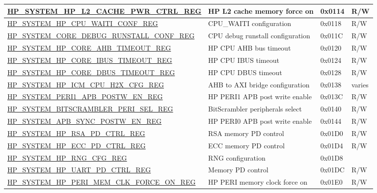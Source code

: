 \begin{longtable}{ | L{8.5cm} | L{6cm} | l | L{1.2cm} | }
\hyperref[regdesc:HPSYSTEMHPL2CACHEPWRCTRLREG]{HP\_SYSTEM\_HP\_L2\_CACHE\_PWR\_CTRL\_REG} & HP L2 cache memory force on & 0x0114 & R/W \\ \hline
\hyperref[regdesc:HPSYSTEMHPCPUWAITICONFREG]{HP\_SYSTEM\_HP\_CPU\_WAITI\_CONF\_REG} & CPU\_WAITI configuration & 0x0118 & R/W \\ \hline
\hyperref[regdesc:HPSYSTEMCOREDEBUGRUNSTALLCONFREG]{HP\_SYSTEM\_CORE\_DEBUG\_RUNSTALL\_CONF\_REG} & CPU debug runstall configuration & 0x011C & R/W \\ \hline
\hyperref[regdesc:HPSYSTEMHPCOREAHBTIMEOUTREG]{HP\_SYSTEM\_HP\_CORE\_AHB\_TIMEOUT\_REG} & HP CPU AHB bus timeout & 0x0120 & R/W \\ \hline
\hyperref[regdesc:HPSYSTEMHPCOREIBUSTIMEOUTREG]{HP\_SYSTEM\_HP\_CORE\_IBUS\_TIMEOUT\_REG} & HP CPU IBUS timeout & 0x0124 & R/W \\ \hline
\hyperref[regdesc:HPSYSTEMHPCOREDBUSTIMEOUTREG]{HP\_SYSTEM\_HP\_CORE\_DBUS\_TIMEOUT\_REG} & HP CPU DBUS timeout & 0x0128 & R/W \\ \hline
\hyperref[regdesc:HPSYSTEMHPICMCPUH2XCFGREG]{HP\_SYSTEM\_HP\_ICM\_CPU\_H2X\_CFG\_REG} & AHB to AXI bridge configuration & 0x0138 & varies \\ \hline
\hyperref[regdesc:HPSYSTEMPERI1APBPOSTWENREG]{HP\_SYSTEM\_PERI1\_APB\_POSTW\_EN\_REG} & HP PERI1 APB post write enable & 0x013C & R/W \\ \hline
\hyperref[regdesc:HPSYSTEMBITSCRAMBLERPERISELREG]{HP\_SYSTEM\_BITSCRAMBLER\_PERI\_SEL\_REG} & BitScrambler peripherals select & 0x0140 & R/W \\ \hline
\hyperref[regdesc:HPSYSTEMAPBSYNCPOSTWENREG]{HP\_SYSTEM\_APB\_SYNC\_POSTW\_EN\_REG} & HP PERI0 APB post write enable & 0x0144 & R/W \\ \hline
\hyperref[regdesc:HPSYSTEMHPRSAPDCTRLREG]{HP\_SYSTEM\_HP\_RSA\_PD\_CTRL\_REG} & RSA memory PD control & 0x01D0 & R/W \\ \hline
\hyperref[regdesc:HPSYSTEMHPECCPDCTRLREG]{HP\_SYSTEM\_HP\_ECC\_PD\_CTRL\_REG} & ECC memory PD control & 0x01D4 & R/W \\ \hline
\hyperref[regdesc:HPSYSTEMHPRNGCFGREG]{HP\_SYSTEM\_HP\_RNG\_CFG\_REG} & RNG configuration & 0x01D8 &  \\ \hline
\hyperref[regdesc:HPSYSTEMHPUARTPDCTRLREG]{HP\_SYSTEM\_HP\_UART\_PD\_CTRL\_REG} & Memory PD control & 0x01DC & R/W \\ \hline
\hyperref[regdesc:HPSYSTEMHPPERIMEMCLKFORCEONREG]{HP\_SYSTEM\_HP\_PERI\_MEM\_CLK\_FORCE\_ON\_REG} & HP PERI memory clock force on & 0x01E0 & R/W \\ \hline

\end{longtable}
